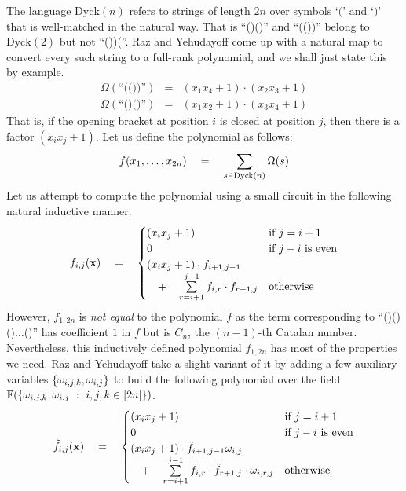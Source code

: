 The language $\mathrm{Dyck}(n)$ refers to strings of length $2n$ over symbols `$($' and `$)$' that is well-matched in the natural way. 
That is ``()()'' and ``(())'' belong to $\mathrm{Dyck}(2)$ but not ``())(''. 
Raz and Yehudayoff come up with a natural map to convert every such string to a full-rank polynomial, and we shall just state this by example. 
\begin{eqnarray*}
\Omega(\text{``(())''}) & = & (x_1x_4 + 1)\cdot (x_2x_3 + 1)\\
\Omega(\text{``()()''}) & = & (x_1x_2 + 1)\cdot (x_3x_4 + 1)
\end{eqnarray*}
That is, if the opening bracket at position $i$ is closed at position $j$, then there is a factor $(x_ix_j + 1)$. 
Let us define the polynomial as follows:
\[
f(x_1,\dots, x_{2n}) \quad = \quad \sum_{s\in \mathrm{Dyck}(n)} \Omega(s) 
\]
Let us attempt to compute the polynomial using a small circuit in the following natural inductive manner. 
\[
f_{i,j}(\mathbf{x}) \quad = \quad \begin{cases}
(x_ix_j+1) & \text{if $j = i+1$}\\
0 & \text{if $j-i$ is even}\\
(x_ix_j+1) \cdot f_{i+1,j-1} &\\
 \quad + \quad \sum\limits_{r=i+1}^{j-1} f_{i,r}\cdot f_{r+1,j} & \text{otherwise}
\end{cases}
\]
However, $f_{1,2n}$ is \emph{not equal} to the polynomial $f$ as the term corresponding to ``()()()$\dots$()'' has coefficient $1$ in $f$ but is $C_n$, the $(n-1)$-th Catalan number. 
Nevertheless, this inductively defined polynomial $f_{1,2n}$ has most of the properties we need. 
Raz and Yehudayoff take a slight variant of it by adding a few auxiliary variables $\left\{\omega_{i,j,k},\omega_{i,j}\right\}$ to build the following polynomial over the field $\mathbb{F}(\left\{{\omega_{i,j,k},\omega_{i,j}}\ : \ {i,j,k\in [2n]}\right\})$. 
\[
\tilde{f}_{i,j}(\mathbf{x}) \quad = \quad \begin{cases}
(x_ix_j+1) & \text{if $j = i+1$}\\
0 & \text{if $j-i$ is even}\\
(x_ix_j+1) \cdot \tilde{f}_{i+1,j-1} \omega_{i,j}&\\
 \quad + \quad \sum\limits_{r=i+1}^{j-1} \tilde{f}_{i,r}\cdot \tilde{f}_{r+1,j} \cdot \omega_{i,r,j} & \text{otherwise}
\end{cases}
\]


